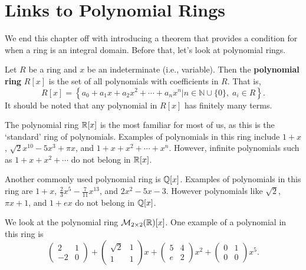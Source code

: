 \section{Links to Polynomial Rings}
We end this chapter off with introducing a theorem that provides a condition for when a ring is an integral domain. Before that, let's look at polynomial rings.
\begin{definition}
    Let $R$ be a ring and $x$ be an indeterminate (i.e., variable). Then the \textbf{polynomial ring} $R[x]$ is the set of all polynomials with coefficients in $R$. That is,
    \[
        R[x] = \left\{a_0+a_1x+a_2x^2+\cdots+a_nx^n \vert n \in \mathbb{N}\cup\{0\},\;a_i \in R\right\}.
    \]
    It should be noted that any polynomial in $R[x]$ has finitely many terms.
\end{definition}
\begin{example}
    The polynomial ring $\mathbb{R}[x]$ is the most familiar for most of us, as this is the `standard' ring of polynomials. Examples of polynomials in this ring include $1+x$, $\sqrt2x^{10} - 5x^3 + \pi x$, and $1+x+x^2+\cdots+x^n$. However, infinite polynomials such as $1+x+x^2+\cdots$ do not belong in $\mathbb{R}[x]$.
\end{example}
\begin{example}
    Another commonly used polynomial ring is $\mathbb{Q}[x]$. Examples of polynomials in this ring are $1+x$, $\frac23x^5 - \frac7{11}x^{13}$, and $2x^2-5x-3$. However polynomials like $\sqrt2$, $\pi x + 1$, and $1+ex$ do not belong in $\mathbb{Q}[x]$.
\end{example}
\begin{example}
    We look at the polynomial ring $\mathcal{M}_{2\times2}(\mathbb{R})[x]$. One example of a polynomial in this ring is
    \[
        \begin{pmatrix}2&1\\-2&0\end{pmatrix} + \begin{pmatrix}\sqrt2&1\\1&1\end{pmatrix}x + \begin{pmatrix}5&4\\e&2\end{pmatrix}x^2 + \begin{pmatrix}0&1\\0&0\end{pmatrix}x^5.
    \]
\end{example}

